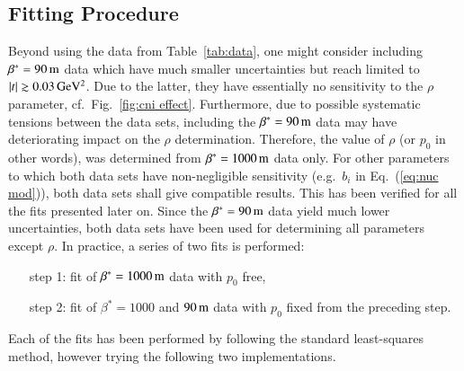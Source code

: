 \subsection{Fitting Procedure}
\label{sec:fit}

Beyond using the data from Table~\ref{tab:data}, one might consider including $\beta^* = 90\,{\rm m}$ data \cite{8tev-90m} which have much smaller uncertainties but reach limited to $|t| \gtrsim 0.03\,{\rm GeV^2}$. Due to the latter, they have essentially no sensitivity to the $\rho$ parameter, cf.~Fig.~\ref{fig:cni effect}. Furthermore, due to possible systematic tensions between the data sets, including the $\beta^* = 90\,{\rm m}$ data may have deteriorating impact on the $\rho$ determination. Therefore, the value of $\rho$ (or $p_0$ in other words), was determined from $\beta^* = 1000\,{\rm m}$ data only. For other parameters to which both data sets have non-negligible sensitivity (e.g.~$b_i$ in Eq.~(\ref{eq:nuc mod})), both data sets shall give compatible results. This has been verified for all the fits presented later on. Since the $\beta^* = 90\,{\rm m}$ data yield much lower uncertainties, both data sets have been used for determining all parameters except $\rho$. In practice, a series of two fits is performed:
\begin{enumerate}[leftmargin=2cm]
\item[step 1:] fit of $\beta^* = 1000\,{\rm m}$ data with $p_0$ free,
\item[step 2:] fit of $\beta^* = 1000$ and $90\,{\rm m}$ data with $p_0$ fixed from the preceding step.
\end{enumerate}

Each of the fits has been performed by following the standard least-squares method, however trying the following two implementations.

